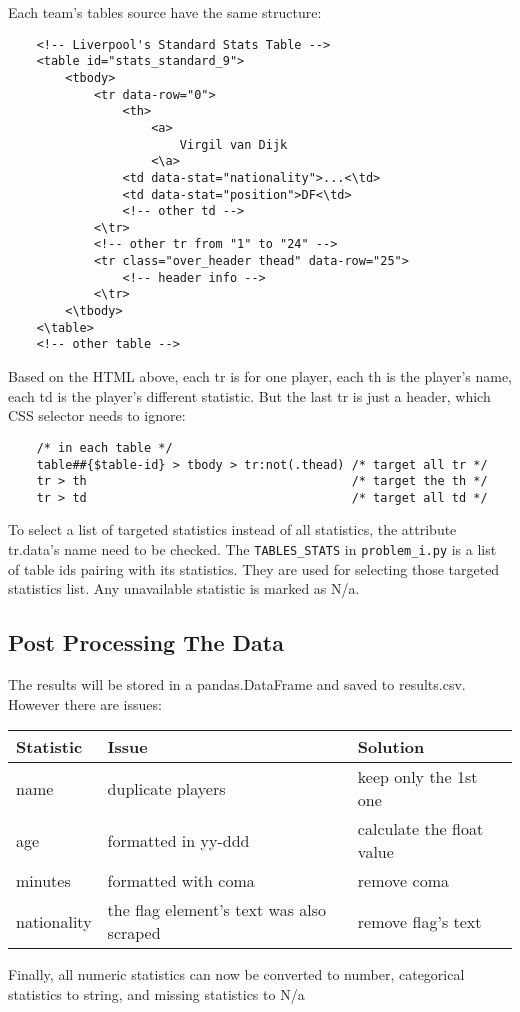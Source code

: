 \documentclass{report}
\begin{document}
\noindent Each team's tables source have the same structure:
\begin{verbatim}
    <!-- Liverpool's Standard Stats Table -->
    <table id="stats_standard_9">
        <tbody>
            <tr data-row="0">
                <th>
                    <a>
                        Virgil van Dijk
                    <\a>
                <td data-stat="nationality">...<\td>
                <td data-stat="position">DF<\td>
                <!-- other td -->
            <\tr>
            <!-- other tr from "1" to "24" -->
            <tr class="over_header thead" data-row="25">
                <!-- header info -->
            <\tr>
        <\tbody>
    <\table>
    <!-- other table -->
\end{verbatim}

\noindent Based on the HTML above, each tr is for one player, each th is the player's name, each td is the 
player's different statistic. But the last tr is just a header, which CSS selector needs to ignore:
\begin{verbatim}
    /* in each table */
    table##{$table-id} > tbody > tr:not(.thead) /* target all tr */ 
    tr > th                                     /* target the th */
    tr > td                                     /* target all td */
\end{verbatim}

\noindent To select a list of targeted statistics instead of all statistics, the attribute tr.data's 
name need to be checked. The \verb|TABLES_STATS| in \verb|problem_i.py| is a list of 
table ids pairing with its statistics. They are used for selecting those targeted statistics list. 
Any unavailable statistic is marked as N/a.

\subsection{Post Processing The Data}
The results will be stored in a pandas.DataFrame and saved to results.csv. However there are issues:
\begin{center}
\centering
    \begin{tabular}{|l|l|l|}
    \hline
    Statistic & Issue & Solution \\
    \hline
    name & duplicate players & keep only the 1st one \\
    \hline
    age & formatted in yy-ddd & calculate the float value \\
    \hline
    minutes & formatted with coma & remove coma \\
    \hline
    nationality & the flag element's text was also scraped & remove flag's text \\
    \hline
    \end{tabular}
\end{center}
Finally, all numeric statistics can now be converted to number, categorical statistics to string, and
missing statistics to N/a
\end{document}
